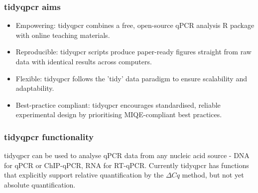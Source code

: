 \documentclass{SBCbookchapter}
\begin{document}
\subsubsection{tidyqpcr aims}

\begin{itemize}
    \item Empowering: tidyqpcr combines a free, open-source qPCR analysis R package with online teaching materials.
    \item Reproducible: tidyqpcr scripts produce paper-ready figures straight from raw data with identical results across computers.
    \item Flexible: tidyqpcr follows the 'tidy' data paradigm to ensure scalability and adaptability.
    \item Best-practice compliant: tidyqpcr encourages standardised, reliable experimental design by prioritising MIQE-compliant best practices.
\end{itemize}

\subsubsection{tidyqpcr functionality}

tidyqpcr can be used to analyse qPCR data from any nucleic acid source - DNA for qPCR or ChIP-qPCR, RNA for RT-qPCR. Currently tidyqpcr has functions that explicitly support relative quantification by the $\Delta Cq$ method, but not yet absolute quantification.
\end{document}
